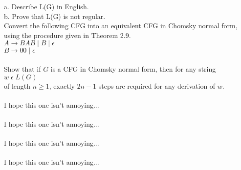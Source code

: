 \documentclass[12pt]{article}
\begin{document}
\noindent
a. Describe L(G) in English. \\
b. Prove that L(G) is not regular. \\

 Convert the following CFG into an equivalent CFG in Chomsky normal form,
using the procedure given in Theorem 2.9. \\

\noindent
$A \rightarrow BAB \; | \; B \; | \; \epsilon $ \\
$B \rightarrow 00 \; | \; \epsilon $ \\

 \\
Show that if $G$ is a CFG in Chomsky normal form, then for any string $w \; \epsilon \; L(G)$ \\
of length $n \geq 1$, exactly $2n - 1$ steps are required 
for any derivation of $w$. \\

 \\

I hope this one isn't annoying... \\

 \\

I hope this one isn't annoying... \\

 \\

I hope this one isn't annoying... \\

 \\

I hope this one isn't annoying... \\
\end{document}
